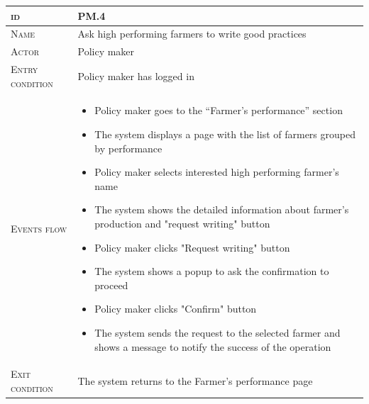 \begin{table}[H]
    \centering
    \begin{tabular}{|l|p{}|}
        \hline %
    	\textsc{id}                 &   PM.4\\
    	\hline %
    	\textsc{Name}               &   Ask high performing farmers to write good practices\\
    	\hline %
    	\textsc{Actor}             &   Policy maker\\
    	\hline %
    	\textsc{Entry condition}   &   Policy maker has logged in\\
    	\hline %
    	\textsc{Events flow}         &   %
            	                        \begin{itemize}
                                    	    \item Policy maker goes to the “Farmer’s performance” section
                                    		\item The system displays a page with the list of farmers grouped by performance
                                    		\item Policy maker selects interested high performing farmer’s name
                                    		\item The system shows the detailed information about farmer’s production and "request writing" button
                                    		\item Policy maker clicks "Request writing" button
                                    		\item The system shows a popup to ask the confirmation to proceed
                                    		\item Policy maker clicks "Confirm" button
                                    		\item The system sends the request to the selected farmer and shows a message to notify the success of the operation
                                        \end{itemize}\\
        \hline %
        \textsc{Exit condition}    &  The system returns to the Farmer’s performance page\\

\end{tabular}
\end{table}
